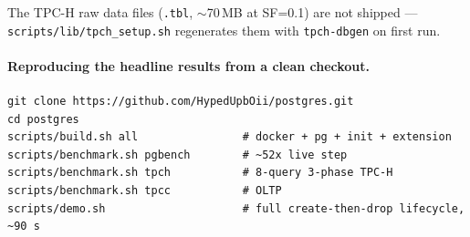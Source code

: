 \documentclass[10pt,a4paper]{article}
\newcommand{\code}[1]{\texttt{\small #1}}
\begin{document}
The TPC-H raw data files (\code{*.tbl}, $\sim$70\,MB at SF=0.1) are
not shipped --- \code{scripts/lib/tpch\_setup.sh} regenerates them
with \code{tpch-dbgen} on first run.

\paragraph{Reproducing the headline results from a clean checkout.}

\begin{verbatim}
git clone https://github.com/HypedUpbOii/postgres.git
cd postgres
scripts/build.sh all                # docker + pg + init + extension
scripts/benchmark.sh pgbench        # ~52x live step
scripts/benchmark.sh tpch           # 8-query 3-phase TPC-H
scripts/benchmark.sh tpcc           # OLTP
scripts/demo.sh                     # full create-then-drop lifecycle, ~90 s
\end{verbatim}
\end{document}

